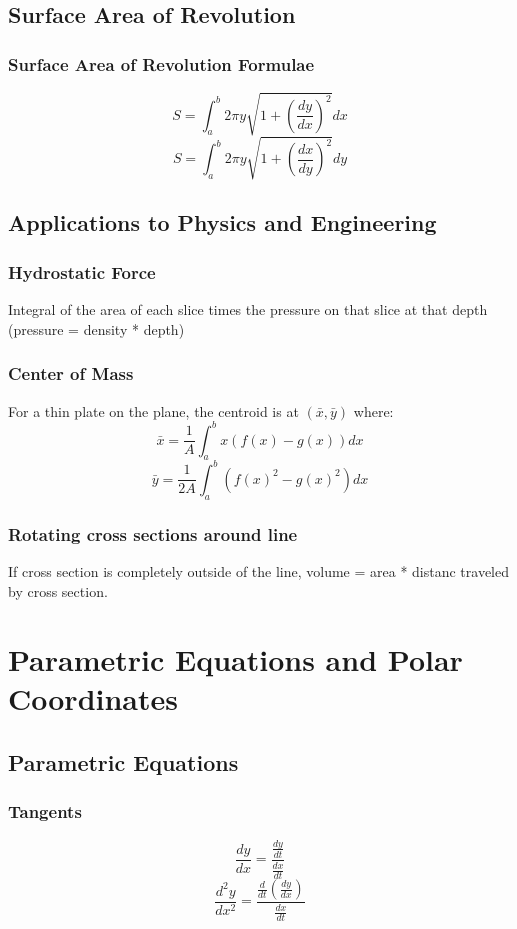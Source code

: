 \documentclass[a4paper,12pt]{report}
\begin{document}
\section{Surface Area of Revolution}
\subsection{Surface Area of Revolution Formulae}
$$S = \int_a^b 2\pi y \sqrt{1+(\frac{dy}{dx})^2}dx$$
$$S = \int_a^b 2\pi y \sqrt{1+(\frac{dx}{dy})^2}dy$$

\section{Applications to Physics and Engineering}
\subsection{Hydrostatic Force}
Integral of the area of each slice times the pressure on that slice at that depth (pressure = density * depth)

\subsection{Center of Mass}
For a thin plate on the plane, the centroid is at $(\bar{x}, \bar{y})$ where:
$$ \bar{x} = \frac{1}{A} \int_a^b x(f(x)-g(x))dx $$
$$ \bar{y} = \frac{1}{2A} \int_a^b (f(x)^2 -g(x)^2) dx$$

\subsection{Rotating cross sections around line}
If cross section is completely outside of the line, volume = area * distanc traveled by cross section.

\chapter{Parametric Equations and Polar Coordinates}
\section{Parametric Equations}
\subsection{Tangents}
$$\frac{dy}{dx} = \frac{ \frac{dy}{dt} }{ \frac{dx}{dt} }$$
$$\frac{d^2y}{dx^2} = \frac{ \frac{d}{dt}(\frac{dy}{dx}) }{ \frac{dx}{dt} }$$
\end{document}
